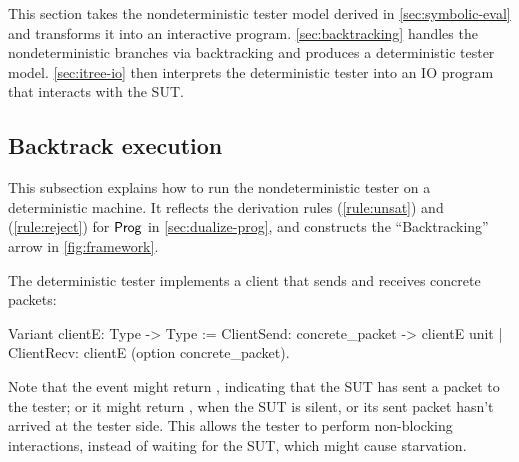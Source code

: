 This section takes the nondeterministic tester model derived in
\autoref{sec:symbolic-eval} and transforms it into an interactive program.
\autoref{sec:backtracking} handles the nondeterministic branches via
backtracking and produces a deterministic tester model.  \autoref{sec:itree-io}
then interprets the deterministic tester into an IO program that interacts with
the SUT.

\subsection{Backtrack execution}
\label{sec:backtracking}
This subsection explains how to run the nondeterministic tester on a
deterministic machine.  It reflects the derivation rules (\ref{rule:unsat}) and
(\ref{rule:reject}) for $\mathsf{Prog}$ in \autoref{sec:dualize-prog}, and constructs
the ``Backtracking'' arrow in \autoref{fig:framework}.

The deterministic tester implements a client that sends and receives concrete
packets:
\begin{coq}
  Variant clientE: Type -> Type :=
    ClientSend: concrete_packet -> clientE unit
  | ClientRecv: clientE (option concrete_packet).
\end{coq}

Note that the  event might return , indicating
that the SUT has sent a packet  to the tester; or it might
return , when the SUT is silent, or its sent packet hasn't arrived at
the tester side.  This allows the tester to perform non-blocking interactions,
instead of waiting for the SUT, which might cause starvation.

